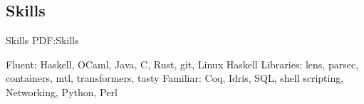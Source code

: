 \documentclass[letterpaper,10pt,oneside]{simpleresume}
\begin{document}
\begin{minipage}[t][0pt]{\linewidth}
\begin{body}





\section%
{Skills}
{Skills}
{PDF:Skills}

Fluent: Haskell, OCaml, Java, C, Rust, git, Linux
\GapNoBreak%
Haskell Libraries: lens, parsec, containers, mtl, transformers, tasty
\GapNoBreak%
Familiar: Coq, Idris, SQL, shell scripting, Networking, Python, Perl

\end{body}
\end{minipage}
\end{document}
